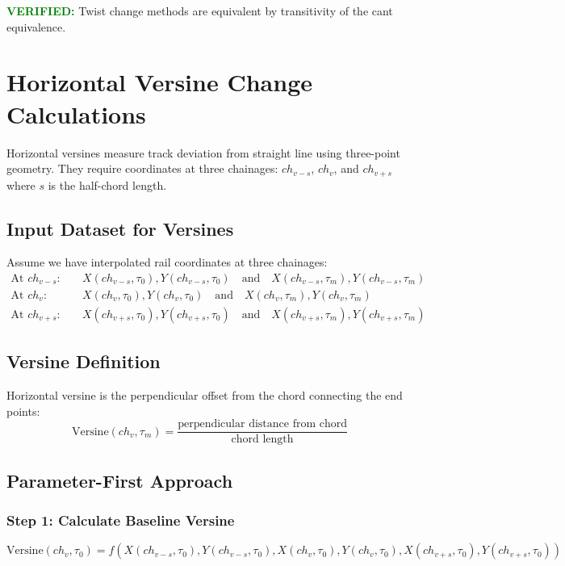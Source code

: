\documentclass{article}
\begin{document}
\textcolor{green}{\textbf{VERIFIED:}} Twist change methods are equivalent by transitivity of the cant equivalence.

\section{Horizontal Versine Change Calculations}
Horizontal versines measure track deviation from straight line using three-point geometry. They require coordinates at three chainages: $ch_{v-s}$, $ch_v$, and $ch_{v+s}$ where $s$ is the half-chord length.

\subsection{Input Dataset for Versines}
Assume we have interpolated rail coordinates at three chainages:
\begin{align}
\text{At } ch_{v-s}: \quad &X(ch_{v-s}, \tau_0), Y(ch_{v-s}, \tau_0) \quad \text{and} \quad X(ch_{v-s}, \tau_m), Y(ch_{v-s}, \tau_m) \\
\text{At } ch_v: \quad &X(ch_v, \tau_0), Y(ch_v, \tau_0) \quad \text{and} \quad X(ch_v, \tau_m), Y(ch_v, \tau_m) \\
\text{At } ch_{v+s}: \quad &X(ch_{v+s}, \tau_0), Y(ch_{v+s}, \tau_0) \quad \text{and} \quad X(ch_{v+s}, \tau_m), Y(ch_{v+s}, \tau_m)
\end{align}

\subsection{Versine Definition}
Horizontal versine is the perpendicular offset from the chord connecting the end points:
\begin{equation}
\text{Versine}(ch_v, \tau_m) = \frac{\text{perpendicular distance from chord}}{\text{chord length}}
\end{equation}

\subsection{Parameter-First Approach}

\subsubsection{Step 1: Calculate Baseline Versine}
\begin{equation}
\text{Versine}(ch_v, \tau_0) = f(X(ch_{v-s}, \tau_0), Y(ch_{v-s}, \tau_0), X(ch_v, \tau_0), Y(ch_v, \tau_0), X(ch_{v+s}, \tau_0), Y(ch_{v+s}, \tau_0))
\end{equation}
\end{document}
